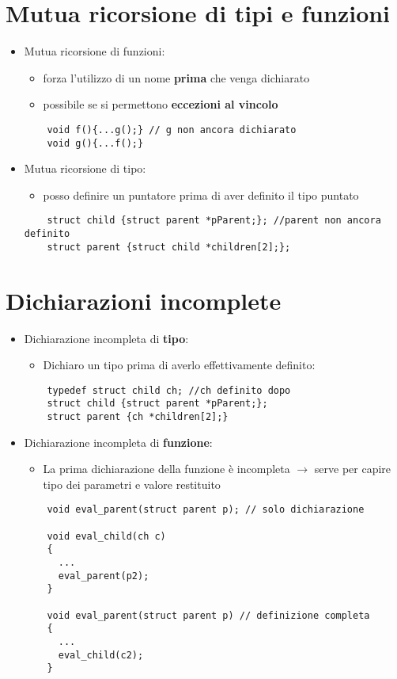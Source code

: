\documentclass[12pt]{extarticle}
\begin{document}
\section*{Mutua ricorsione di tipi e funzioni}
\begin{itemize}
  \item Mutua ricorsione di funzioni:
  \begin{itemize}
    \item forza l'utilizzo di un nome \textbf{prima} che venga dichiarato
    \item possibile se si permettono \textbf{eccezioni al vincolo}
  \end{itemize}
  \begin{lstlisting}
    void f(){...g();} // g non ancora dichiarato
    void g(){...f();}
  \end{lstlisting}
  \item Mutua ricorsione di tipo:
  \begin{itemize}
    \item posso definire un puntatore prima di aver definito il tipo puntato
  \end{itemize}
  \begin{lstlisting}
    struct child {struct parent *pParent;}; //parent non ancora definito
    struct parent {struct child *children[2];};
  \end{lstlisting}
\end{itemize}

\section*{Dichiarazioni incomplete}
\begin{itemize}
  \item Dichiarazione incompleta di \textbf{tipo}:
  \begin{itemize}
    \item Dichiaro un tipo prima di averlo effettivamente definito:
  \end{itemize}
  \begin{lstlisting}
    typedef struct child ch; //ch definito dopo
    struct child {struct parent *pParent;};
    struct parent {ch *children[2];}
  \end{lstlisting}
  \item Dichiarazione incompleta di \textbf{funzione}:
  \begin{itemize}
    \item La prima dichiarazione della funzione è incompleta $\rightarrow$ serve per capire tipo dei parametri e valore restituito
  \end{itemize}
  \begin{lstlisting}
    void eval_parent(struct parent p); // solo dichiarazione
    
    void eval_child(ch c)
    {
      ...
      eval_parent(p2);
    }

    void eval_parent(struct parent p) // definizione completa
    { 
      ...
      eval_child(c2);
    }
  \end{lstlisting}
\end{itemize}
\end{document}
